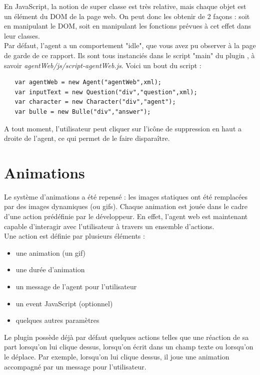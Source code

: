 \documentclass[11pt,dvipsnames,svgnames]{report}
\begin{document}
	En JavaScript, la notion de super classe est très relative, mais chaque objet est un élément du DOM de la page web. On peut donc les obtenir de 2 façons : soit en manipulant le DOM, soit en manipulant les fonctions prévues à cet effet dans leur classes.\\
	
	Par défaut, l'agent a un comportement "idle", que vous avez pu observer à la page de garde de ce rapport. Ils sont tous instanciés dans le script "main" du plugin , à savoir \emph{agentWeb/js/script-agentWeb.js}. Voici un bout du script : \\
	
	\begin{lstlisting}
   var agentWeb = new Agent("agentWeb",xml);
   var inputText = new Question("div","question",xml);
   var character = new Character("div","agent");
   var bulle = new Bulle("div","answer");
\end{lstlisting} 	
	
	A tout moment, l'utilisateur peut cliquer sur l’icône de suppression en haut a droite de l'agent, ce qui permet de le faire disparaître.
	

	\section{Animations}
	
	Le système d'animations a été repensé : les images statiques ont été remplacées par des images dynamiques (ou gifs). Chaque animation est jouée dans le cadre d'une action prédéfinie par le développeur. En effet, l'agent web est maintenant capable d’interagir avec l'utilisateur à travers un ensemble d'actions.\\
	 
	Une action est définie par plusieurs éléments :\\
	\begin{itemize}
	\item une animation (un gif)
	\item une durée d'animation
	\item un message de l'agent pour l'utilisateur
	\item un event JavaScript (optionnel)
	\item quelques autres paramètres\\
	\end{itemize}
	
	Le plugin possède déjà par défaut quelques actions telles que une réaction de sa part lorsqu'on lui clique dessus, lorsqu'on écrit dans un champ texte ou lorsqu'on le déplace. Par exemple, lorsqu'on lui clique dessus, il joue une animation accompagné par un message pour l'utilisateur. \\	
	
\end{document}
